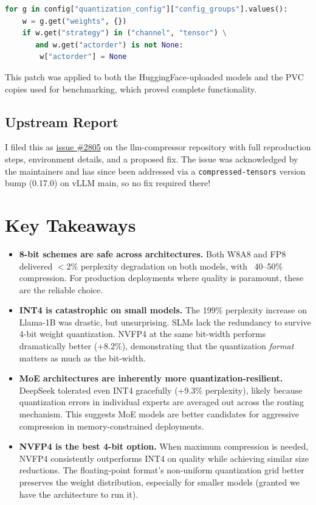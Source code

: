 \documentclass[10pt,twocolumn]{article}
\begin{document}
\begin{lstlisting}[language=Python]
for g in config["quantization_config"]["config_groups"].values():
    w = g.get("weights", {})
    if w.get("strategy") in ("channel", "tensor") \
       and w.get("actorder") is not None:
        w["actorder"] = None
\end{lstlisting}

This patch was applied to both the HuggingFace-uploaded models and the PVC copies used for benchmarking, which proved complete functionality.

\subsection{Upstream Report}

I filed this as \href{https://github.com/vllm-project/llm-compressor/issues/2805}{issue \#2805} on the llm-compressor repository with full reproduction steps, environment details, and a proposed fix. The issue was acknowledged by the maintainers and has since been addressed via a \texttt{compressed-tensors} version bump (0.17.0) on vLLM main, so no fix required there!


\section{Key Takeaways}
\begin{itemize}
  \item \textbf{8-bit schemes are safe across architectures.} Both W8A8 and FP8 delivered $<$2\% perplexity degradation on both models, with ~40--50\% compression. For production deployments where quality is paramount, these are the reliable choice.

  \item \textbf{INT4 is catastrophic on small models.} The 199\% perplexity increase on Llama-1B was drastic, but unsurprising. SLMs lack the redundancy to survive 4-bit weight quantization. NVFP4 at the same bit-width performs dramatically better (+8.2\%), demonstrating that the quantization \emph{format} matters as much as the bit-width.

  \item \textbf{MoE architectures are inherently more quantization-resilient.} DeepSeek tolerated even INT4 gracefully (+9.3\% perplexity), likely because quantization errors in individual experts are averaged out across the routing mechanism. This suggests MoE models are better candidates for aggressive compression in memory-constrained deployments.

  \item \textbf{NVFP4 is the best 4-bit option.} When maximum compression is needed, NVFP4 consistently outperforms INT4 on quality while achieving similar size reductions. The floating-point format's non-uniform quantization grid better preserves the weight distribution, especially for smaller models (granted we have the architecture to run it).

\end{itemize}
\end{document}
